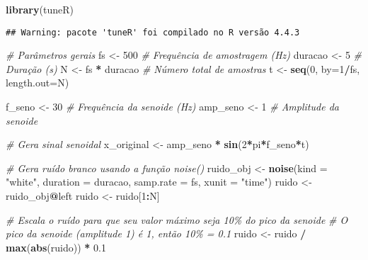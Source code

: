 \documentclass[
]{article}
\newenvironment{Shaded}{\begin{snugshade}}{\end{snugshade}}
\newcommand{\AttributeTok}[1]{\textcolor[rgb]{0.13,0.29,0.53}{#1}}
\newcommand{\CommentTok}[1]{\textcolor[rgb]{0.56,0.35,0.01}{\textit{#1}}}
\newcommand{\DecValTok}[1]{\textcolor[rgb]{0.00,0.00,0.81}{#1}}
\newcommand{\FloatTok}[1]{\textcolor[rgb]{0.00,0.00,0.81}{#1}}
\newcommand{\FunctionTok}[1]{\textcolor[rgb]{0.13,0.29,0.53}{\textbf{#1}}}
\newcommand{\NormalTok}[1]{#1}
\newcommand{\OtherTok}[1]{\textcolor[rgb]{0.56,0.35,0.01}{#1}}
\newcommand{\SpecialCharTok}[1]{\textcolor[rgb]{0.81,0.36,0.00}{\textbf{#1}}}
\newcommand{\StringTok}[1]{\textcolor[rgb]{0.31,0.60,0.02}{#1}}
\begin{document}
\begin{Shaded}
\begin{Highlighting}[]
\FunctionTok{library}\NormalTok{(tuneR)}
\end{Highlighting}
\end{Shaded}

\begin{verbatim}
## Warning: pacote 'tuneR' foi compilado no R versão 4.4.3
\end{verbatim}

\begin{Shaded}
\begin{Highlighting}[]
\CommentTok{\# Parâmetros gerais}
\NormalTok{fs }\OtherTok{\textless{}{-}} \DecValTok{500}         \CommentTok{\# Frequência de amostragem (Hz)}
\NormalTok{duracao }\OtherTok{\textless{}{-}} \DecValTok{5}      \CommentTok{\# Duração (s)}
\NormalTok{N }\OtherTok{\textless{}{-}}\NormalTok{ fs }\SpecialCharTok{*}\NormalTok{ duracao }\CommentTok{\# Número total de amostras}
\NormalTok{t }\OtherTok{\textless{}{-}} \FunctionTok{seq}\NormalTok{(}\DecValTok{0}\NormalTok{, }\AttributeTok{by=}\DecValTok{1}\SpecialCharTok{/}\NormalTok{fs, }\AttributeTok{length.out=}\NormalTok{N)}

\NormalTok{f\_seno }\OtherTok{\textless{}{-}} \DecValTok{30}      \CommentTok{\# Frequência da senoide (Hz)}
\NormalTok{amp\_seno }\OtherTok{\textless{}{-}} \DecValTok{1}     \CommentTok{\# Amplitude da senoide}

\CommentTok{\# Gera sinal senoidal}
\NormalTok{x\_original }\OtherTok{\textless{}{-}}\NormalTok{ amp\_seno }\SpecialCharTok{*} \FunctionTok{sin}\NormalTok{(}\DecValTok{2}\SpecialCharTok{*}\NormalTok{pi}\SpecialCharTok{*}\NormalTok{f\_seno}\SpecialCharTok{*}\NormalTok{t)}

\CommentTok{\# Gera ruído branco usando a função noise()}
\NormalTok{ruido\_obj }\OtherTok{\textless{}{-}} \FunctionTok{noise}\NormalTok{(}\AttributeTok{kind =} \StringTok{"white"}\NormalTok{, }\AttributeTok{duration =}\NormalTok{ duracao, }\AttributeTok{samp.rate =}\NormalTok{ fs, }\AttributeTok{xunit =} \StringTok{"time"}\NormalTok{)}
\NormalTok{ruido }\OtherTok{\textless{}{-}}\NormalTok{ ruido\_obj}\SpecialCharTok{@}\NormalTok{left }
\NormalTok{ruido }\OtherTok{\textless{}{-}}\NormalTok{ ruido[}\DecValTok{1}\SpecialCharTok{:}\NormalTok{N]}

\CommentTok{\# Escala o ruído para que seu valor máximo seja 10\% do pico da senoide}
\CommentTok{\# O pico da senoide (amplitude 1) é 1, então 10\% = 0.1}
\NormalTok{ruido }\OtherTok{\textless{}{-}}\NormalTok{ ruido }\SpecialCharTok{/} \FunctionTok{max}\NormalTok{(}\FunctionTok{abs}\NormalTok{(ruido)) }\SpecialCharTok{*} \FloatTok{0.1}


\end{Highlighting}
\end{Shaded}
\end{document}
